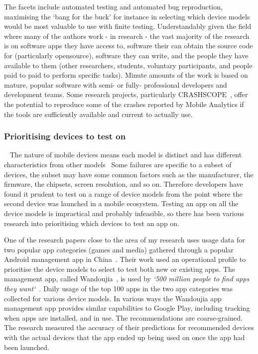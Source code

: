 The facets include automated testing and automated bug reproduction, maximising the `bang for the buck' for instance in selecting which device models would be most valuable to use with finite testing. Understandably given the field where many of the authors work - in research - the vast majority of the research is on software apps they have access to, software their can obtain the source code for (particularly opensource), software they can write, and the people they have available to them (other researchers, students, voluntary participants, and people paid to paid to perform specific tasks). Minute amounts of the work is based on mature, popular software with semi- or fully- professional developers and development teams. Some research projects, particularly CRASHSCOPE~, offer the potential to reproduce some of the crashes reported by Mobile Analytics if the tools are sufficiently available and current to actually use.


\subsubsection{Prioritising devices to test on}~\label{rw-prioritising-devices-to-test-on-topic}
The nature of mobile devices means each model is distinct and has different characteristics from other models~ Some failures are specific to a subset of devices, the subset may have some common factors such as the manufacturer, the firmware, the chipsets, screen resolution, and so on. Therefore developers have found it prudent to test on a range of device models from the point where the second device was launched in a mobile ecosystem. Testing an app on all the device models is impractical and probably infeasible, so there has been various research into prioritising which devices to test an app on.

One of the research papers close to the area of my research uses usage data for two popular app categories (games and media) gathered through a popular Android management app in China~. Their work used an operational profile to prioritise the device models to select to test both new or existing apps. The management app, called Wandoujia~, is used by \emph{`500 million people to find apps they want`}~. Daily usage of the top 100 apps in the two app categories was collected for various device models. In various ways the Wandoujia app management app provides similar capabilities to Google Play, including tracking when apps are installed, and in use. The recommendations are coarse-grained. The research measured the accuracy of their predictions for recommended devices with the actual devices that the app ended up being used on once the app had been launched. 

